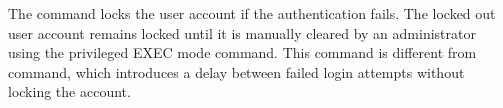 









The  command locks the user account if the authentication fails. The locked out user account remains locked until it is manually cleared by an administrator using the  privileged EXEC mode command. This command is different from  command, which introduces a delay between failed login attempts without locking the account.\\

